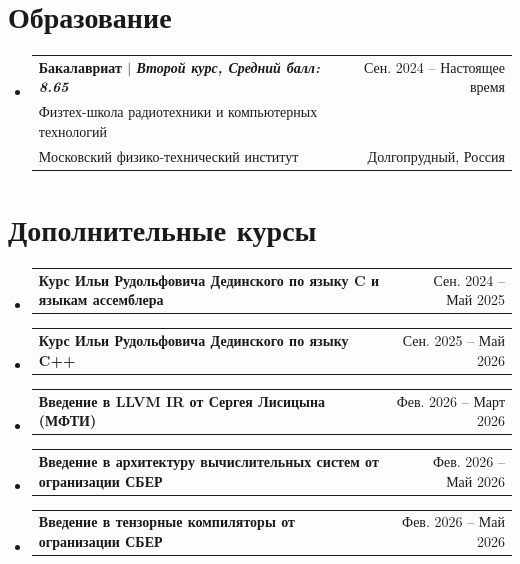 \documentclass[A4,11pt]{article}
\makeatletter
\newcommand{\CVSubheading}[4]{
  \vspace{-2pt}\item
    \begin{tabular*}{0.97\textwidth}[t]{l@{\extracolsep{\fill}}r}
      \textbf{#1} & #2 \\
      \small#3 & \small #4 \\
    \end{tabular*}\vspace{-7pt}
}
\newcommand{\CVSubheadingDenFirst}[2]{
  \vspace{-2pt}\item
    \begin{tabular*}{0.97\textwidth}[t]{l@{\extracolsep{\fill}}r}
      \textbf{#1} & #2
    \end{tabular*}\vspace{-7pt}
}
\newcommand{\CVSubheadingDen}[2]{
  \vspace{-14pt}\item
    \begin{tabular*}{0.97\textwidth}[t]{l@{\extracolsep{\fill}}r}
      \textbf{#1} & #2
    \end{tabular*}\vspace{-7pt}
}
\newcommand{\CVSubHeadingListStart}{\begin{itemize}[leftmargin=0.5cm, label={}]}
\newcommand{\CVSubHeadingListEnd}{\end{itemize}}
\newcommand{\CVItemListEnd}{\end{itemize}\vspace{-5pt}}
\makeatother
\begin{document}

\section{Образование}
  \CVSubHeadingListStart
    \CVSubheading
      {{Бакалавриат $|$ \emph{\small{Второй курс, Средний балл: 8.65}}}}{Сен. 2024 -- Настоящее время}
      {Физтех-школа радиотехники и компьютерных технологий \\ Московский физико-технический институт}{Долгопрудный, Россия}
\CVItemListEnd

\section{Дополнительные курсы}
  \CVSubHeadingListStart
    \CVSubheadingDenFirst
      {{Курс Ильи Рудольфовича Дединского по языку C и языкам ассемблера}}{Сен. 2024 -- Май 2025}
    \CVSubheadingDen
      {{Курс Ильи Рудольфовича Дединского по языку C++}}{Сен. 2025 -- Май 2026}
    \CVSubheadingDen
      {{Введение в LLVM IR от Сергея Лисицына (МФТИ)}}{Фев. 2026 -- Март 2026}
    \CVSubheadingDen
      {{Введение в архитектуру вычислительных систем от огранизации СБЕР}}{Фев. 2026 -- Май 2026}
    \CVSubheadingDen
      {{Введение в тензорные компиляторы от огранизации СБЕР}}{Фев. 2026 -- Май 2026}
  \CVSubHeadingListEnd
\end{document}
